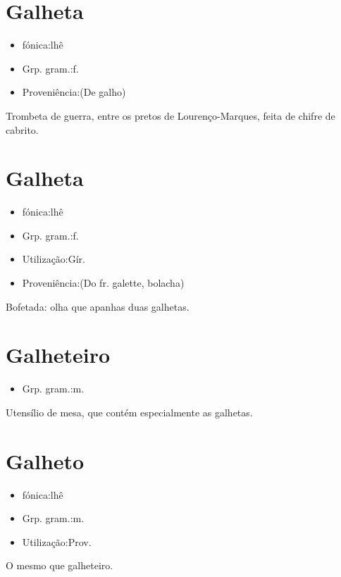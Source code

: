 \section{Galheta}
\begin{itemize}
\item {fónica:lhê}
\end{itemize}
\begin{itemize}
\item {Grp. gram.:f.}
\end{itemize}
\begin{itemize}
\item {Proveniência:(De \textunderscore galho\textunderscore )}
\end{itemize}
Trombeta de guerra, entre os pretos de Lourenço-Marques, feita de chifre de cabrito.
\section{Galheta}
\begin{itemize}
\item {fónica:lhê}
\end{itemize}
\begin{itemize}
\item {Grp. gram.:f.}
\end{itemize}
\begin{itemize}
\item {Utilização:Gír.}
\end{itemize}
\begin{itemize}
\item {Proveniência:(Do fr. \textunderscore galette\textunderscore , bolacha)}
\end{itemize}
Bofetada: \textunderscore olha que apanhas duas galhetas\textunderscore .
\section{Galheteiro}
\begin{itemize}
\item {Grp. gram.:m.}
\end{itemize}
Utensílio de mesa, que contém especialmente as galhetas.
\section{Galheto}
\begin{itemize}
\item {fónica:lhê}
\end{itemize}
\begin{itemize}
\item {Grp. gram.:m.}
\end{itemize}
\begin{itemize}
\item {Utilização:Prov.}
\end{itemize}
O mesmo que \textunderscore galheteiro\textunderscore .
